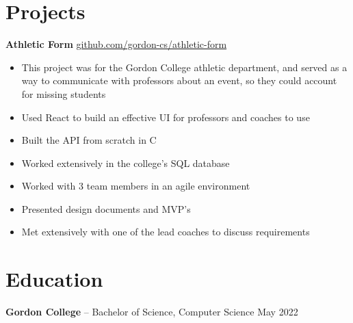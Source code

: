 \documentclass[11pt]{article}       %
\newcommand{\CS}{C\nolinebreak\hspace{-.05em}\raisebox{.6ex}{\scriptsize\bf \#}}
\begin{document}

\vspace{-18.5pt}

\section*{Projects}
\textbf{Athletic Form} \hfill \href{https://github.com/gordon-cs/athletic-form}{github.com/gordon-cs/athletic-form} \\
\vspace{-9pt}
\begin{itemize}
  \item{This project was for the Gordon College athletic department, and served as a way to communicate with professors 
		  about an event, so they could account for missing students}
  \item{Used React to build an effective UI for professors and coaches to use}
  \item{Built the API from scratch in \CS}
  \item{Worked extensively in the college's SQL database}
  \item{Worked with 3 team members in an agile environment}
  \item{Presented design documents and MVP's}
  \item{Met extensively with one of the lead coaches to discuss requirements}
\end{itemize}


\vspace{-18.5pt}

\section*{Education}
\textbf{Gordon College} -- Bachelor of Science, Computer Science \hfill May 2022
\end{document}
